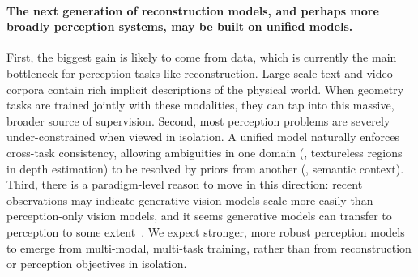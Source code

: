\paragraph{The next generation of reconstruction models, and perhaps more broadly perception systems, may be built on unified models.}
First, the biggest gain is likely to come from data, which is currently the main bottleneck for perception tasks like reconstruction.
Large-scale text and video corpora contain rich implicit descriptions of the physical world.
When geometry tasks are trained jointly with these modalities, they can tap into this massive, broader source of supervision.
Second, most perception problems are severely under-constrained when viewed in isolation.
A unified model naturally enforces cross-task consistency, allowing ambiguities in one domain (\eg, textureless regions in depth estimation) to be resolved by priors from another (\eg, semantic context).
Third, there is a paradigm-level reason to move in this direction: recent observations may indicate generative vision models scale more easily than perception-only vision models, and it seems generative models can transfer to perception to some extent~\cite{gabeur26image}.
We expect stronger, more robust perception models to emerge from multi-modal, multi-task training, rather than from reconstruction or perception objectives in isolation.
